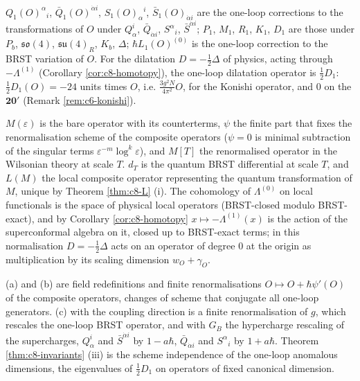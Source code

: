 \begin{remark}
$Q_1(O)^\alpha{}_i$, $\bar Q_1(O)^{\dot\alpha i}$, $S_1(O)_\alpha{}^i$, $\bar S_1(O)_{\dot\alpha i}$ are the one-loop corrections to the transformations of $O$ under $Q^i_\alpha$, $\bar Q_{\dot\alpha i}$, $S^\alpha{}_i$, $\bar S^{\dot\alpha i}$; $P_1$, $M_1$, $R_1$, $K_1$, $D_1$ are those under $P_b$, $\mathfrak{so}(4)$, $\mathfrak{su}(4)_R$, $K_b$, $\Delta$; $\hbar L_1(O)^{(0)}$ is the one-loop correction to the BRST variation of $O$. For the dilatation $D=-\tfrac12\Delta$ of physics, acting through $-\Lambda^{(1)}$ (Corollary \ref{cor:c8-homotopy}), the one-loop dilatation operator is $\tfrac12D_1$: $\tfrac12D_1(O)=-24$ units times $O$, i.e. $\frac{3g^2N}{4\pi^2}O$, for the Konishi operator, and $0$ on the $\mathbf{20'}$ (Remark \ref{rem:c6-konishi}).
\end{remark}

\begin{remark}
$M(\varepsilon)$ is the bare operator with its counterterms, $\psi$ the finite part that fixes the renormalisation scheme of the composite operators ($\psi=0$ is minimal subtraction of the singular terms $\varepsilon^{-m}\log^k\varepsilon$), and $M[T]$ the renormalised operator in the Wilsonian theory at scale $T$. $d_T$ is the quantum BRST differential at scale $T$, and $L(M)$ the local composite operator representing the quantum transformation of $M$, unique by Theorem \ref{thm:c8-L} (i). The cohomology of $\Lambda^{(0)}$ on local functionals is the space of physical local operators (BRST-closed modulo BRST-exact), and by Corollary \ref{cor:c8-homotopy} $x\mapsto-\Lambda^{(1)}(x)$ is the action of the superconformal algebra on it, closed up to BRST-exact terms; in this normalisation $D=-\tfrac12\Delta$ acts on an operator of degree $0$ at the origin as multiplication by its scaling dimension $w_O+\gamma_O$.
\end{remark}

\begin{remark}
(a) and (b) are field redefinitions and finite renormalisations $O\mapsto O+\hbar\psi'(O)$ of the composite operators, changes of scheme that conjugate all one-loop generators. (c) with the coupling direction is a finite renormalisation of $g$, which rescales the one-loop BRST operator, and with $G_B$ the hypercharge rescaling of the supercharges, $Q^i_\alpha$ and $\bar S^{\dot\alpha i}$ by $1-a\hbar$, $\bar Q_{\dot\alpha i}$ and $S^\alpha{}_i$ by $1+a\hbar$. Theorem \ref{thm:c8-invariants} (iii) is the scheme independence of the one-loop anomalous dimensions, the eigenvalues of $\tfrac12D_1$ on operators of fixed canonical dimension.
\end{remark}

